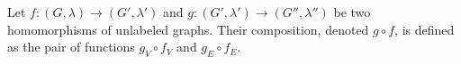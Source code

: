 \begin{definition}
    \label{def:graph:composition}
    Let $f: (G,\lambda) \to (G',\lambda')$ and $g: (G',\lambda') \to (G'',\lambda'')$ be two homomorphisms of unlabeled graphs. Their composition, denoted $g \circ f$, is defined as the pair of functions $g_V \circ f_V$ and $g_E \circ f_E$.
\end{definition}